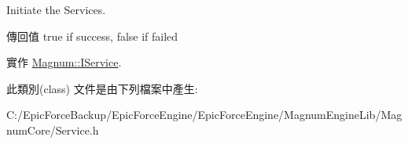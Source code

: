Initiate the Services. 

\begin{DoxyReturn}{傳回值}
true if success, false if failed 
\end{DoxyReturn}


實作 \hyperlink{class_magnum_1_1_i_service_a176411207a279a2d22aaec10a74861fe}{Magnum\+::\+I\+Service}.



此類別(class) 文件是由下列檔案中產生\+:\begin{DoxyCompactItemize}
\item 
C\+:/\+Epic\+Force\+Backup/\+Epic\+Force\+Engine/\+Epic\+Force\+Engine/\+Magnum\+Engine\+Lib/\+Magnum\+Core/Service.\+h\end{DoxyCompactItemize}
